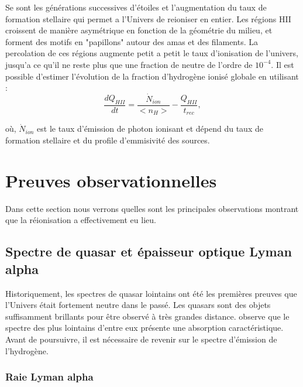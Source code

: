 Se sont les générations successives d'étoiles et l'augmentation du taux de formation stellaire qui permet a l'Univers de reioniser en entier.
Les régions HII croissent de manière asymétrique en fonction de la géométrie du milieu, et forment des motifs en "papillons" autour des amas et des filaments.
La percolation de ces régions augmente petit a petit le taux d'ionisation de l'univers, jusqu'a ce qu'il ne reste plus que une fraction de neutre de l'ordre de $10^{-4}$.
Il est possible d'estimer l'évolution de la fraction d'hydrogène ionisé globale en utilisant :
\begin{equation}
\frac{dQ_{HII}}{dt} = \frac{\dot{N}_{ion}}{ <n_H>} - \frac{Q_{HII}}{t_{rec}},
\end{equation}

où, $\dot{N}_{ion}$  est le taux d'émission de photon ionisant et dépend du taux de formation stellaire et du profile d'emmisivité des sources.


\section{Preuves observationnelles}
\label{sec_contraintes_obs}

Dans cette section nous verrons quelles sont les principales observations montrant que la réionisation a effectivement eu lieu.

\subsection{Spectre de quasar et épaisseur optique Lyman alpha}

Historiquement, les spectres de quasar lointains ont été les premières preuves que l'Univers était fortement neutre dans le passé.
Les quasars sont des objets suffisamment brillants pour être observé à très grandes distance.
\cite{1965ApJ...141.1295S} observe que le spectre des plus lointains d'entre eux présente une absorption caractéristique.%
Avant de poursuivre, il est nécessaire  de revenir sur le spectre d’émission de l’hydrogène.

\subsubsection*{Raie Lyman alpha}

